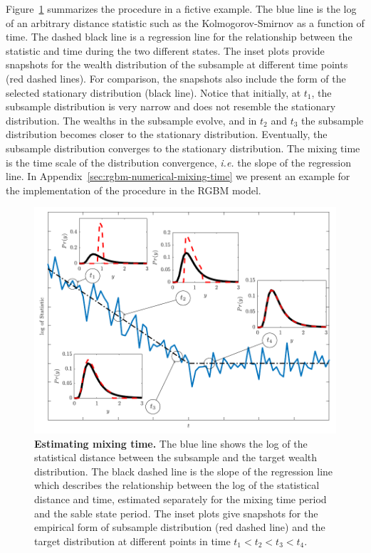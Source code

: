 \documentclass[11pt]{article}
\newcommand{\ie}{{\it i.e.}\xspace}
\newcommand{\Fref}[1]{Figure~\ref{fig:#1}}
\numberwithin{equation}{section}
\begin{document}
\Fref{mixing-time} summarizes the procedure in a fictive example. The blue line is the log of an arbitrary distance statistic such as the Kolmogorov-Smirnov as a function of time. The dashed black line is a regression line for the relationship between the statistic and time during the two different states. The inset plots provide snapshots for the wealth distribution of the subsample at different time points (red dashed lines). For comparison, the snapshots also include the form of the selected stationary distribution (black line). Notice that initially, at $t_1$, the subsample distribution is very narrow and does not resemble the stationary distribution. The wealths in the subsample evolve, and in $t_2$ and $t_3$ the subsample distribution becomes closer to the stationary distribution. Eventually, the subsample distribution converges to the stationary distribution. The mixing time is the time scale of the distribution convergence, \ie the slope of the regression line. In Appendix~\ref{sec:rgbm-numerical-mixing-time} we present an example for the implementation of the procedure in the RGBM model.

\begin{figure}[!htb]
\centering
\includegraphics[width=1.0\textwidth]{figs/fig_mixing_time.pdf}
\caption{\textbf{Estimating mixing time.} The blue line shows the log of the statistical distance between the subsample and the target wealth distribution. The black dashed line is the slope of the regression line which describes the relationship between the log of the statistical distance and time, estimated separately for the mixing time period and the sable state period. The inset plots give snapshots for the empirical form of subsample distribution (red dashed line) and the target distribution at different points in time $t_1 < t_2 < t_3 < t_4$.
\label{fig:mixing-time}}
\end{figure}
\FloatBarrier
\end{document}
